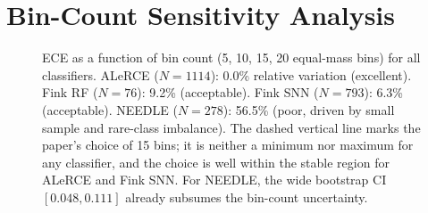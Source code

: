 \documentclass[twocolumn]{aastex631}
\begin{document}
\section{Bin-Count Sensitivity Analysis}\label{app:bins}

\begin{figure}
\caption{ECE as a function of bin count (5, 10, 15, 20 equal-mass bins) for all classifiers. ALeRCE ($N = 1114$): 0.0\% relative variation (excellent). Fink RF ($N = 76$): 9.2\% (acceptable). Fink SNN ($N = 793$): 6.3\% (acceptable). NEEDLE ($N = 278$): 56.5\% (poor, driven by small sample and rare-class imbalance). The dashed vertical line marks the paper's choice of 15 bins; it is neither a minimum nor maximum for any classifier, and the choice is well within the stable region for ALeRCE and Fink SNN. For NEEDLE, the wide bootstrap CI $[0.048, 0.111]$ already subsumes the bin-count uncertainty. \label{fig:bins}}
\end{figure}
\end{document}
